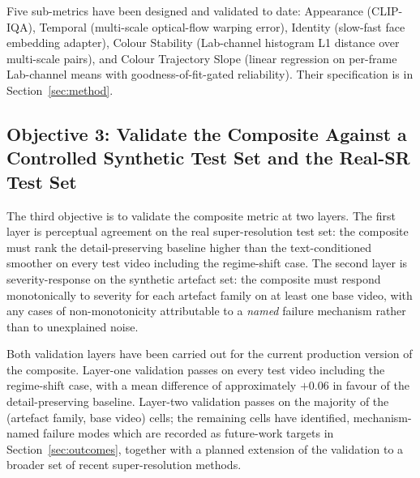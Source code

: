 Five sub-metrics have been designed and validated to date: Appearance (CLIP-IQA),
Temporal (multi-scale optical-flow warping error), Identity (slow-fast face embedding
adapter), Colour Stability (Lab-channel histogram L1 distance over multi-scale pairs), and
Colour Trajectory Slope (linear regression on per-frame Lab-channel means with
goodness-of-fit-gated reliability). Their specification is in Section~\ref{sec:method}.

\subsection{Objective 3: Validate the Composite Against a Controlled Synthetic Test Set and
the Real-SR Test Set}
\label{sec:obj:validate}

The third objective is to validate the composite metric at two layers. The first layer is
perceptual agreement on the real super-resolution test set: the composite must rank the
detail-preserving baseline higher than the text-conditioned smoother on every test video
including the regime-shift case. The second layer is severity-response on the synthetic
artefact set: the composite must respond monotonically to severity for each artefact family
on at least one base video, with any cases of non-monotonicity attributable to a
\emph{named} failure mechanism rather than to unexplained noise.

Both validation layers have been carried out for the current production version of the
composite. Layer-one validation passes on every test video including the regime-shift case,
with a mean difference of approximately $+0.06$ in favour of the detail-preserving baseline.
Layer-two validation passes on the majority of the (artefact family, base video) cells; the
remaining cells have identified, mechanism-named failure modes which are recorded as
future-work targets in Section~\ref{sec:outcomes}, together with a planned extension of the
validation to a broader set of recent super-resolution methods.

